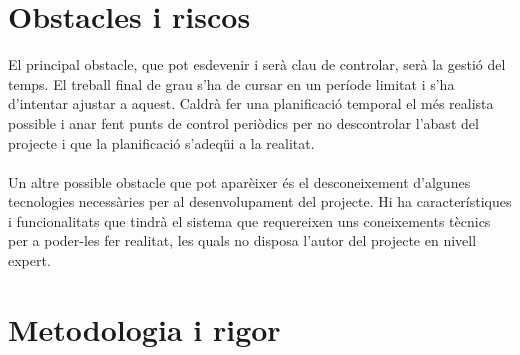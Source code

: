 
\section{Obstacles i riscos}

El principal obstacle, que pot esdevenir i serà clau de controlar, serà la gestió del temps. El treball final de grau s’ha de cursar en un període limitat i s’ha d’intentar ajustar a aquest. Caldrà fer una planificació temporal el més realista possible i anar fent punts de control periòdics per no descontrolar l’abast del projecte i que la planificació s’adeqüi a la realitat.
\\\\
Un altre possible obstacle que pot aparèixer és el desconeixement d’algunes tecnologies necessàries per al desenvolupament del projecte. Hi ha característiques i funcionalitats que tindrà el sistema que requereixen uns coneixements tècnics per a poder-les fer realitat, les quals no disposa l’autor del projecte en nivell expert.


\section{Metodologia i rigor}

